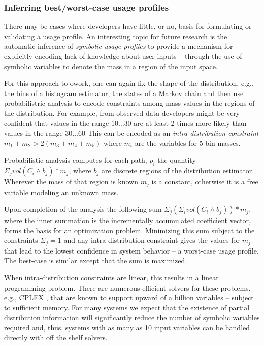 \subsubsection{Inferring best/worst-case usage profiles}
There may be cases where developers have little, or no, basis for
formulating or validating a usage profile.  An interesting topic for
future research is the automatic inference of {\em symbolic usage
  profiles} to provide a mechanism for explicitly encoding lack of
knowledge about user inputs -- through the use of symbolic variables
to denote the mass in a region of the input space.

For this approach to owork, one can again fix the shape of the
distribution, e.g., the bins of a histogram estimator, the states of a
Markov chain and then use probabilistric analysis to encode
constraints among mass values in the regions of the distribution.  
For example, from observed data developers might be
very confident that values in the range $10 \ldots 30$ are at least 2
times more likely than values in the range $30 \ldots 60$ This can be
encoded as an \textit{intra-distribution constraint} $m_1 + m_2 >
2(m_3 + m_4 + m_5)$ where $m_i$ are the variables for 5 bin masses.

Probabilistic analysis computes for each path, $p_i$
the quantity $\Sigma_{j} vol(C_i \wedge b_j)*m_j$, where $b_j$ are discrete
regions of the distribution estimator.  Wherever the mass
of that region is known $m_j$ is a constant, otherwise it is
a free variable modeling an unknown mass.


Upon completion of the analysis the following sum
$\Sigma_{j} (\Sigma_i vol(C_i \wedge b_j)) *m_j$, where
the inner summation 
is the incrementally accumulated coefficient vector,
forms the basis for an optimization problem.
Minimizing this sum subject to the constraints  
$\Sigma_j = 1$ and any intra-distribution constraint gives
the values for $m_j$ that lead to the lowest confidence in
system behavior -- a worst-case usage profile.  The best-case
is similar except that the sum is maximized.

When intra-distribution constraints are linear, this results
in a linear programming problem.  There are numerous efficient solvers
for these problems, e.g., CPLEX \cite{cplex2009v12}, that are known to
support upward of a billion variables -- subject to sufficient memory.
For many systems we expect that the existence of partial distribution
information
will significantly reduce the number of symbolic variables required
and, thus, systems with as many as 10 input variables can be handled
directly with off the shelf solvers. 

